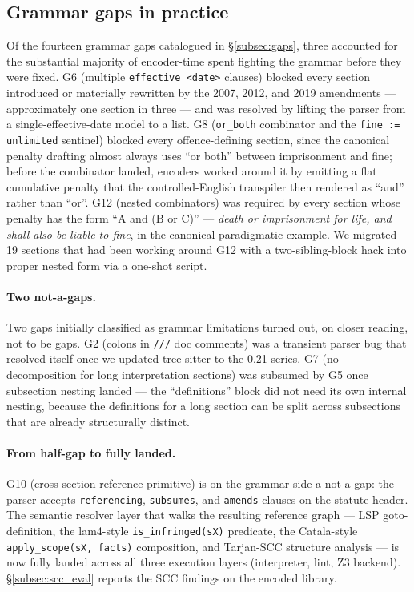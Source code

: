 \subsection{Grammar gaps in practice}
\label{subsec:gaps_eval}

Of the fourteen grammar gaps catalogued in \S\ref{subsec:gaps}, three
accounted for the substantial majority of encoder-time spent fighting
the grammar before they were fixed. \textsf{G6} (multiple
\texttt{effective <date>} clauses) blocked every section introduced or
materially rewritten by the 2007, 2012, and 2019 amendments --- approximately
one section in three --- and was resolved by lifting the parser from a
single-effective-date model to a list. \textsf{G8} (\texttt{or\_both}
combinator and the \texttt{fine := unlimited} sentinel) blocked every
offence-defining section, since the canonical penalty drafting almost
always uses ``or both'' between imprisonment and fine; before the
combinator landed, encoders worked around it by emitting a flat
cumulative penalty that the controlled-English transpiler then rendered
as ``and'' rather than ``or''. \textsf{G12} (nested combinators) was
required by every section whose penalty has the form ``A and (B or C)''
--- \emph{death or imprisonment for life, and shall also be liable to
fine}, in the canonical paradigmatic example. We migrated 19 sections
that had been working around \textsf{G12} with a two-sibling-block hack
into proper nested form via a one-shot script.

\paragraph{Two not-a-gaps.} Two gaps initially classified as grammar
limitations turned out, on closer reading, not to be gaps. \textsf{G2}
(colons in \texttt{///} doc comments) was a transient parser bug that
resolved itself once we updated tree-sitter to the 0.21 series.
\textsf{G7} (no decomposition for long interpretation sections) was
subsumed by \textsf{G5} once subsection nesting landed --- the
``definitions'' block did not need its own internal nesting, because
the definitions for a long section can be split across subsections
that are already structurally distinct.

\paragraph{From half-gap to fully landed.} \textsf{G10} (cross-section
reference primitive) is on the grammar side a not-a-gap: the parser
accepts \texttt{referencing}, \texttt{subsumes}, and \texttt{amends}
clauses on the statute header. The semantic resolver layer that walks
the resulting reference graph --- LSP goto-definition, the lam4-style
\texttt{is\_infringed(sX)} predicate, the Catala-style
\texttt{apply\_scope(sX, facts)} composition, and Tarjan-SCC structure
analysis --- is now fully landed across all three execution layers
(interpreter, lint, Z3 backend). \S\ref{subsec:scc_eval} reports the
SCC findings on the encoded library.

